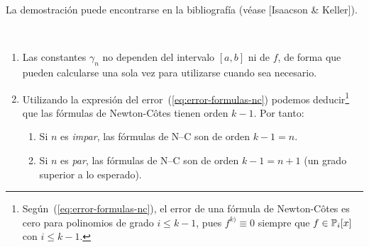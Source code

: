 La demostración puede encontrarse en la
bibliografía (véase [Isaacson \& Keller]).%

\begin{remark}~
  \label{rk:7}
  \begin{enumerate}
  \item Las constantes $\gamma_n$ no dependen del intervalo $[a,b]$ ni
    de $f$, de forma que pueden calcularse una sola vez para
    utilizarse cuando sea necesario.
  \item Utilizando la expresión del error~(\ref{eq:error-formulas-nc})
    podemos deducir\footnote{Según~(\ref{eq:error-formulas-nc}), el
      error de una fórmula de Newton-Côtes es cero para polinomios de
      grado $i\le k-1$, pues $f^{k)}\equiv 0$ siempre que
      $f\in\operatorname{{\mathbb P}}_{i}[x]$ con $i\le k-1$.} que las fórmulas de
    Newton-Côtes tienen orden $k-1$. Por tanto:
    \begin{enumerate}
    \item Si $n$ es \textit{impar}, las fórmulas de N--C son de
      orden $k-1 = n$.
    \item Si $n$ es \textit{par}, las fórmulas de N--C son de
      orden $k-1 = n+1$ (un grado superior a lo esperado).
    \end{enumerate}


\end{enumerate}
\end{remark}
